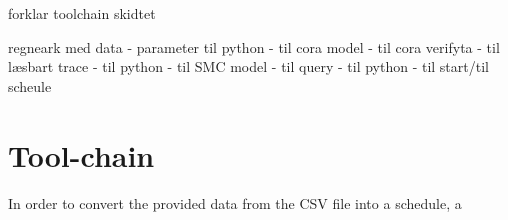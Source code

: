forklar toolchain skidtet
	
	
regneark med data - parameter til python - til cora model - til cora verifyta - til læsbart trace - til python - til SMC model - til query - til python - til start/til scheule
\section{Tool-chain} \label{sec:tool_chain}
In order to convert the provided data from the CSV file into a schedule, a 